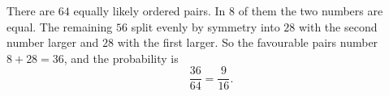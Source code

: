 There are $64$ equally likely ordered pairs. In $8$ of them the two numbers are equal. The remaining $56$ split evenly by symmetry into $28$ with the second number larger and $28$ with the first larger. So the favourable pairs number $8+28=36$, and the probability is
\[
\dfrac{36}{64}=\boxed{\dfrac{9}{16}}.
\]
